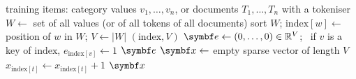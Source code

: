 \documentclass[11pt]{article}
\begin{document}
\begin{algorithm}[H]
\caption{One-hot codes and bag-of-words vectors from an index fitted on training data}\label{alg:bow}
\begin{algorithmic}[1]
\Require training items: category values $v_1, \dots, v_n$, or documents $T_1, \dots, T_n$ with a tokeniser
  \State $W \gets$ set of all values (or of all tokens of all documents) 
  \State sort $W$; $\mathrm{index}[w] \gets$ position of $w$ in $W$; $V \gets |W|$ 
  \State \Return $(\mathrm{index}, V)$
\EndFunction
{}
  \State $\vect{e} \gets (0, \dots, 0) \in \R^V$; \ if $v$ is a key of $\mathrm{index}$, $e_{\mathrm{index}[v]} \gets 1$
  \State \Return $\vect{e}$ 
\EndFunction
{}
  \State $\x \gets$ empty sparse vector of length $V$ 
    \State $x_{\mathrm{index}[t]} \gets x_{\mathrm{index}[t]} + 1$
  \EndFor
  \State \Return $\x$ 
\EndFunction
\end{algorithmic}
\end{algorithm}
\end{document}
